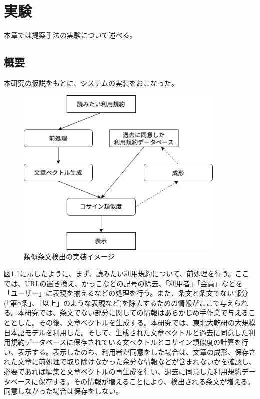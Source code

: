 \chapter{実験}
\label{experiment}

本章では提案手法の実験について述べる。

\section{概要}
\label{sub:実験概要}
本研究の仮説をもとに、システムの実装をおこなった。
\begin{figure}[h]
  \begin{center}
      \includegraphics[width=10cm]{img/system.drawio.png}
      \caption{類似条文検出の実装イメージ}
      \label{img:類似条文検出の実装イメージ}
  \end{center}
\end{figure}
図\ref{img:類似条文検出の実装イメージ}に示したように、まず、読みたい利用規約について、前処理を行う。ここでは、URLの置き換え、かっこなどの記号の除去、「利用者」「会員」などを「ユーザー」に表現を揃えるなどの処理を行う。また、条文と条文でない部分(「第○条」、「以上」のような表現など)を除去するための情報がここで与えられる。本研究では、条文でない部分に関しての情報はあらかじめ手作業で与えることとした。その後、文章ベクトルを生成する。本研究では、東北大乾研の大規模日本語モデルを利用した。そして、生成された文章ベクトルと過去に同意した利用規約データベースに保存されている文ベクトルとコサイン類似度の計算を行い、表示する。表示したのち、利用者が同意をした場合は、文章の成形、保存された文章に前処理で取り除けなかった余分な情報などが含まれないかを確認し、必要であれば編集と文章ベクトルの再生成を行い、過去に同意した利用規約データベースに保存する。その情報が増えることにより、検出される条文が増える。同意しなかった場合は保存をしない。

